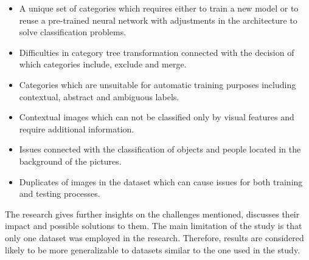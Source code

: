 \begin{itemize}
    \item A unique set of categories which requires either to train a new model or to reuse a pre-trained neural network with adjustments in the architecture to solve classification problems.
    \item Difficulties in category tree transformation connected with the decision of which categories include, exclude and merge.
    \item Categories which are unsuitable for automatic training purposes including contextual, abstract and ambiguous labels.
    \item Contextual images which can not be classified only by visual features and require additional information.
    \item Issues connected with the classification of objects and people located in the background of the pictures.
    \item Duplicates of images in the dataset which can cause issues for both training and testing processes.
\end{itemize}

The research gives further insights on the challenges mentioned, discusses their impact and possible solutions to them. The main limitation of the study is that only one dataset was employed in the research. Therefore, results are considered likely to be more generalizable to datasets similar to the one used in the study. 